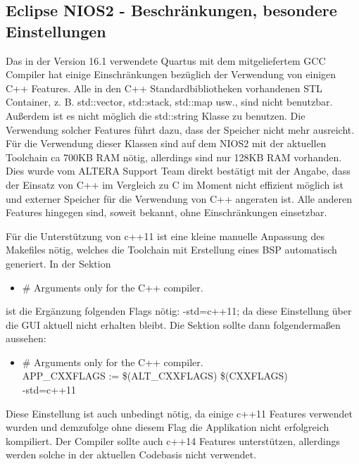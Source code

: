 \subsection{Eclipse NIOS2 - Beschränkungen, besondere Einstellungen}
Das in der Version 16.1 verwendete Quartus mit dem mitgeliefertem GCC Compiler hat einige Einschränkungen bezüglich der Verwendung von einigen C++ Features. Alle in den C++ Standardbibliotheken vorhandenen STL Container, z. B. std::vector, std::stack, std::map usw., sind nicht benutzbar. Außerdem ist es nicht möglich die std::string Klasse zu benutzen. Die Verwendung solcher Features führt dazu, dass der Speicher nicht mehr ausreicht. Für die Verwendung dieser Klassen sind auf dem NIOS2 mit der aktuellen Toolchain ca 700KB RAM nötig, allerdings sind nur 128KB RAM vorhanden. Dies wurde vom ALTERA Support Team direkt bestätigt mit der Angabe, dass der Einsatz von C++ im Vergleich zu C im Moment nicht effizient möglich ist und externer Speicher für die Verwendung von C++ angeraten ist. Alle anderen Features hingegen sind, soweit bekannt, ohne Einschränkungen einsetzbar.

Für die Unterstützung von c++11 ist eine kleine manuelle Anpassung des Makefiles nötig, welches die Toolchain mit Erstellung eines BSP automatisch generiert. In der Sektion
\begin{itemize}
 \item \# Arguments only for the C++ compiler.
\end{itemize}
ist die Ergänzung folgenden Flags nötig: -std=c++11; da diese Einstellung über die GUI aktuell nicht erhalten bleibt. Die Sektion sollte dann folgendermaßen aussehen:
\begin{itemize}
 \item \# Arguments only for the C++ compiler.\\APP\_CXXFLAGS := \$(ALT\_CXXFLAGS) \$(CXXFLAGS) \ \\-std=c++11
\end{itemize}
Diese Einstellung ist auch unbedingt nötig, da einige c++11 Features verwendet wurden und demzufolge ohne diesem Flag die Applikation nicht erfolgreich kompiliert. Der Compiler sollte auch c++14 Features unterstützen, allerdings werden solche in der aktuellen Codebasis nicht verwendet.

